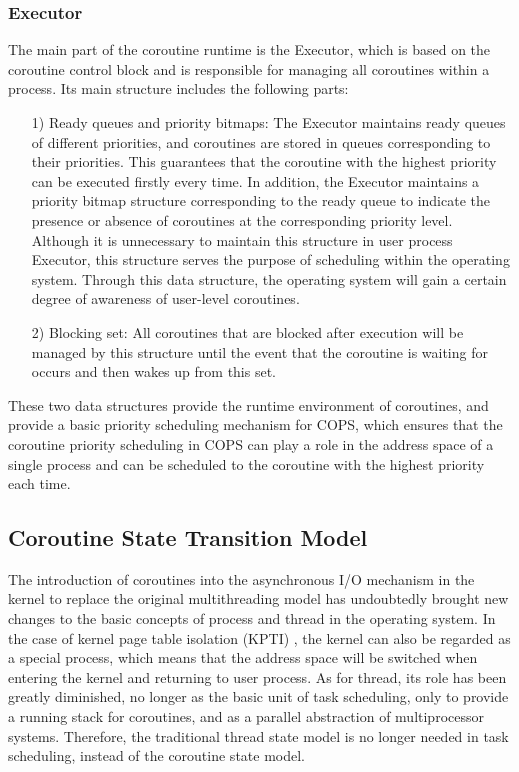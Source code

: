 \documentclass[sigconf,review,anonymous]{acmart}
\begin{document}
\subsubsection{Executor}
\label{subsubsection: executor}

The main part of the coroutine runtime is the Executor, which is based on the coroutine control block and is responsible for managing all coroutines within a process. Its main structure includes the following parts:

\begin{itemize}[leftmargin=*]
    \item[1)] Ready queues and priority bitmaps: The Executor maintains ready queues of different priorities, and coroutines are stored in queues corresponding to their priorities. This guarantees that the coroutine with the highest priority can be executed firstly every time. In addition, the Executor maintains a priority bitmap structure corresponding to the ready queue to indicate the presence or absence of coroutines at the corresponding priority level. Although it is unnecessary to maintain this structure in user process Executor, this structure serves the purpose of scheduling within the operating system. Through this data structure, the operating system will gain a certain degree of awareness of user-level coroutines.
    \item[2)] Blocking set: All coroutines that are blocked after execution will be managed by this structure until the event that the coroutine is waiting for occurs and then wakes up from this set.
\end{itemize}

These two data structures provide the runtime environment of coroutines, and provide a basic priority scheduling mechanism for COPS, which ensures that the coroutine priority scheduling in COPS can play a role in the address space of a single process and can be scheduled to the coroutine with the highest priority each time.

\subsection{Coroutine State Transition Model}
\label{section: state-transition}

The introduction of coroutines into the asynchronous I/O mechanism in the kernel to replace the original multithreading model has undoubtedly brought new changes to the basic concepts of process and thread in the operating system. In the case of kernel page table isolation (KPTI) \cite{kpti}, the kernel can also be regarded as a special process, which means that the address space will be switched when entering the kernel and returning to user process. As for thread, its role has been greatly diminished, no longer as the basic unit of task scheduling, only to provide a running stack for coroutines, and as a parallel abstraction of multiprocessor systems. Therefore, the traditional thread state model is no longer needed in task scheduling, instead of the coroutine state model.
\end{document}
